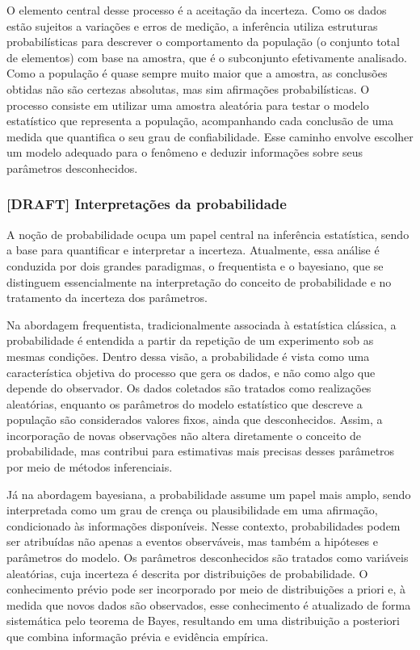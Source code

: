 \documentclass[
  brazilian,
  12pt,
  letterpaper,
  DIV=11,
  numbers=noendperiod]{scrartcl}
\begin{document}
O elemento central desse processo é a aceitação da incerteza. Como os
dados estão sujeitos a variações e erros de medição, a inferência
utiliza estruturas probabilísticas para descrever o comportamento da
população (o conjunto total de elementos) com base na amostra, que é o
subconjunto efetivamente analisado. Como a população é quase sempre
muito maior que a amostra, as conclusões obtidas não são certezas
absolutas, mas sim afirmações probabilísticas. O processo consiste em
utilizar uma amostra aleatória para testar o modelo estatístico que
representa a população, acompanhando cada conclusão de uma medida que
quantifica o seu grau de confiabilidade. Esse caminho envolve escolher
um modelo adequado para o fenômeno e deduzir informações sobre seus
parâmetros desconhecidos.

\subsubsection{{[}DRAFT{]} Interpretações da
probabilidade}\label{draft-interpretauxe7uxf5es-da-probabilidade}

A noção de probabilidade ocupa um papel central na inferência
estatística, sendo a base para quantificar e interpretar a incerteza.
Atualmente, essa análise é conduzida por dois grandes paradigmas, o
frequentista e o bayesiano, que se distinguem essencialmente na
interpretação do conceito de probabilidade e no tratamento da incerteza
dos parâmetros.

Na abordagem frequentista, tradicionalmente associada à estatística
clássica, a probabilidade é entendida a partir da repetição de um
experimento sob as mesmas condições. Dentro dessa visão, a probabilidade
é vista como uma característica objetiva do processo que gera os dados,
e não como algo que depende do observador. Os dados coletados são
tratados como realizações aleatórias, enquanto os parâmetros do modelo
estatístico que descreve a população são considerados valores fixos,
ainda que desconhecidos. Assim, a incorporação de novas observações não
altera diretamente o conceito de probabilidade, mas contribui para
estimativas mais precisas desses parâmetros por meio de métodos
inferenciais.

Já na abordagem bayesiana, a probabilidade assume um papel mais amplo,
sendo interpretada como um grau de crença ou plausibilidade em uma
afirmação, condicionado às informações disponíveis. Nesse contexto,
probabilidades podem ser atribuídas não apenas a eventos observáveis,
mas também a hipóteses e parâmetros do modelo. Os parâmetros
desconhecidos são tratados como variáveis aleatórias, cuja incerteza é
descrita por distribuições de probabilidade. O conhecimento prévio pode
ser incorporado por meio de distribuições a priori e, à medida que novos
dados são observados, esse conhecimento é atualizado de forma
sistemática pelo teorema de Bayes, resultando em uma distribuição a
posteriori que combina informação prévia e evidência empírica.
\end{document}
